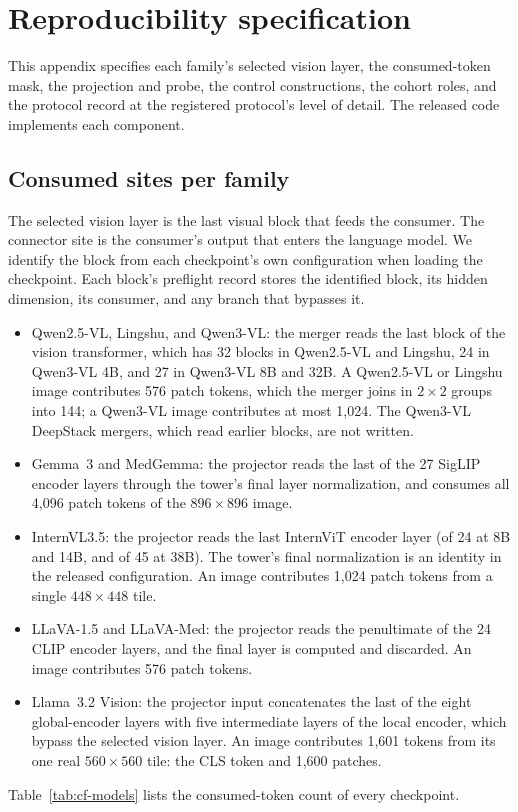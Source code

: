 \section{Reproducibility specification}
\label{app:repro}

This appendix specifies each family's selected vision layer, the consumed-token mask, the projection and probe, the control constructions, the cohort roles, and the protocol record at the registered protocol's level of detail. The released code implements each component.

\subsection{Consumed sites per family}
\label{app:repro-sites}

The selected vision layer is the last visual block that feeds the consumer. The connector site is the consumer's output that enters the language model. We identify the block from each checkpoint's own configuration when loading the checkpoint. Each block's preflight record stores the identified block, its hidden dimension, its consumer, and any branch that bypasses it.

\begin{itemize}[leftmargin=*,itemsep=1pt,topsep=2pt]
\item Qwen2.5-VL, Lingshu, and Qwen3-VL: the merger reads the last block of the vision transformer, which has 32 blocks in Qwen2.5-VL and Lingshu, 24 in Qwen3-VL 4B, and 27 in Qwen3-VL 8B and 32B. A Qwen2.5-VL or Lingshu image contributes 576 patch tokens, which the merger joins in $2\times2$ groups into 144; a Qwen3-VL image contributes at most 1{,}024. The Qwen3-VL DeepStack mergers, which read earlier blocks, are not written.
\item Gemma~3 and MedGemma: the projector reads the last of the 27 SigLIP encoder layers through the tower's final layer normalization, and consumes all 4{,}096 patch tokens of the $896\times896$ image.
\item InternVL3.5: the projector reads the last InternViT encoder layer (of 24 at 8B and 14B, and of 45 at 38B). The tower's final normalization is an identity in the released configuration. An image contributes 1{,}024 patch tokens from a single $448\times448$ tile.
\item LLaVA-1.5 and LLaVA-Med: the projector reads the penultimate of the 24 CLIP encoder layers, and the final layer is computed and discarded. An image contributes 576 patch tokens.
\item Llama~3.2 Vision: the projector input concatenates the last of the eight global-encoder layers with five intermediate layers of the local encoder, which bypass the selected vision layer. An image contributes 1{,}601 tokens from its one real $560\times560$ tile: the CLS token and 1{,}600 patches.
\end{itemize}
Table~\ref{tab:cf-models} lists the consumed-token count of every checkpoint.

